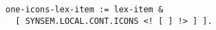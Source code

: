 \documentclass[a4paper]{article}
\begin{document}
{\small\begin{verbatim}
one-icons-lex-item := lex-item &
  [ SYNSEM.LOCAL.CONT.ICONS <! [ ] !> ] ].
\end{verbatim}}
\end{document}
